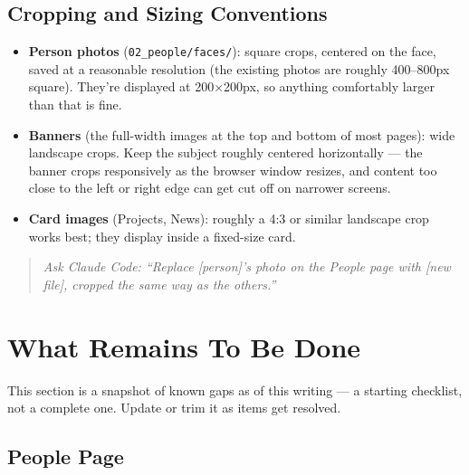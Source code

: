 \documentclass[11pt]{article}
\newcommand{\term}[1]{\textbf{#1}}
\newcommand{\file}[1]{\texttt{#1}}
\begin{document}
\subsection{Cropping and Sizing Conventions}
\label{sec:cropping}

\begin{itemize}
    \item \term{Person photos} (\file{02\_people/faces/}): square
    crops, centered on the face, saved at a reasonable resolution (the
    existing photos are roughly 400--800px square). They're displayed
    at 200×200px, so anything comfortably larger than that is fine.
    \item \term{Banners} (the full-width images at the top and bottom
    of most pages): wide landscape crops. Keep the subject roughly
    centered horizontally --- the banner crops responsively as the
    browser window resizes, and content too close to the left or right
    edge can get cut off on narrower screens.
    \item \term{Card images} (Projects, News): roughly a 4:3 or similar
    landscape crop works best; they display inside a fixed-size card.
\end{itemize}

\begin{quote}
\textit{Ask Claude Code: ``Replace [person]'s photo on the People page
with [new file], cropped the same way as the others.''}
\end{quote}

\section{What Remains To Be Done}

This section is a snapshot of known gaps as of this writing --- a
starting checklist, not a complete one. Update or trim it as items get
resolved.

\subsection{People Page}
\end{document}
